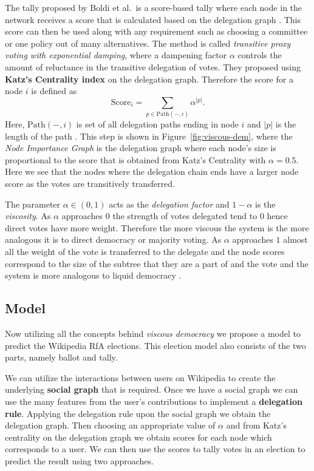 The tally proposed by Boldi et al.\ is a score-based tally where each node in the network receives a score that is calculated based on the delegation graph \cite{ViscousDemocracy}. This score can then be used along with any requirement such as choosing a committee or one policy out of many alternatives. The method is called \textit{transitive proxy voting with exponential damping}, where a dampening factor $\alpha$ controls the amount of reluctance in the transitive delegation of votes. They proposed using \textbf{Katz's Centrality index} on the delegation graph. Therefore the score for a node $i$ is defined as 
\[\text{Score}_{i}  = \sum_{p \in \text{Path}(-,i)} \alpha^{|p|}.\]
Here, $\text{Path}(-,i)$ is set of all delegation paths ending in node $i$ and $|p|$ is the length of the path \cite{ViscousDemocracy}. This step is shown in Figure~\ref{fig:viscous-dem}, where the \textit{Node Importance Graph} is the delegation graph where each node's size is proportional to the score that is obtained from Katz's Centrality with $\alpha=0.5$. Here we see that the nodes where the delegation chain ends have a larger node score as the votes are transitively transferred.

The parameter $\alpha\in (0,1)$ acts as the \textit{delegation factor} and $1-\alpha$ is the \textit{viscosity}. As $\alpha$ approaches $0$ the strength of votes delegated tend to $0$ hence direct votes have more weight. Therefore the more viscous the system is the more analogous it is to direct democracy or majority voting. As $\alpha$ approaches $1$ almost all the weight of the vote is transferred to the delegate and the node scores correspond to the size of the subtree that they are a part of and the vote and the system is more analogous to liquid democracy \cite{ViscousDemocracy}.

\subsection{Model} 
Now utilizing all the concepts behind \textit{viscous democracy} we propose a model to predict the Wikipedia RfA elections. This election model also consists of the two parts, namely ballot and tally. 

We can utilize the interactions between users on Wikipedia to create the underlying \textbf{social graph} that is required. Once we have a social graph we can use the many features from the user's contributions to implement a \textbf{delegation rule}. Applying the delegation rule upon the social graph we obtain the delegation graph. Then choosing an appropriate value of $\alpha$ and from Katz's centrality on the delegation graph we obtain scores for each node which corresponds to a user. We can then use the scores to tally votes in an election to predict the result using two approaches.

